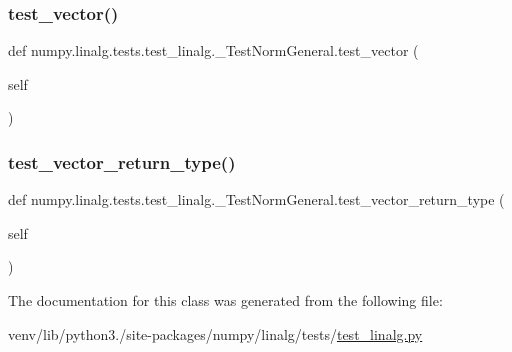 \subsubsection{\texorpdfstring{test\+\_\+vector()}{test\_vector()}}
{\footnotesize\ttfamily def numpy.\+linalg.\+tests.\+test\+\_\+linalg.\+\_\+\+Test\+Norm\+General.\+test\+\_\+vector (\begin{DoxyParamCaption}\item[{}]{self }\end{DoxyParamCaption})}

\mbox{\label{classnumpy_1_1linalg_1_1tests_1_1test__linalg_1_1__TestNormGeneral_acc9897a54ad2a2c3792d4920a944f951}} 
\subsubsection{\texorpdfstring{test\+\_\+vector\+\_\+return\+\_\+type()}{test\_vector\_return\_type()}}
{\footnotesize\ttfamily def numpy.\+linalg.\+tests.\+test\+\_\+linalg.\+\_\+\+Test\+Norm\+General.\+test\+\_\+vector\+\_\+return\+\_\+type (\begin{DoxyParamCaption}\item[{}]{self }\end{DoxyParamCaption})}



The documentation for this class was generated from the following file\+:\begin{DoxyCompactItemize}
\item 
venv/lib/python3./site-\/packages/numpy/linalg/tests/\hyperlink{test__linalg_8py}{test\+\_\+linalg.\+py}\end{DoxyCompactItemize}

